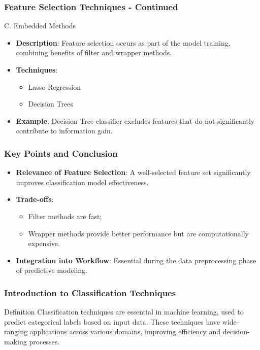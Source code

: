 \documentclass[aspectratio=169]{beamer}
\begin{document}
\begin{frame}[fragile]
    \frametitle{Feature Selection Techniques - Continued}
    \begin{block}{C. Embedded Methods}
        \begin{itemize}
            \item \textbf{Description}: Feature selection occurs as part of the model training, combining benefits of filter and wrapper methods.
            \item \textbf{Techniques}:
                \begin{itemize}
                    \item Lasso Regression
                    \item Decision Trees
                \end{itemize}
            \item \textbf{Example}: Decision Tree classifier excludes features that do not significantly contribute to information gain.
        \end{itemize}
    \end{block}
\end{frame}

\begin{frame}[fragile]
    \frametitle{Key Points and Conclusion}
    \begin{itemize}
        \item \textbf{Relevance of Feature Selection}: A well-selected feature set significantly improves classification model effectiveness.
        \item \textbf{Trade-offs}: 
            \begin{itemize}
                \item Filter methods are fast; 
                \item Wrapper methods provide better performance but are computationally expensive.
            \end{itemize}
        \item \textbf{Integration into Workflow}: Essential during the data preprocessing phase of predictive modeling.
    \end{itemize}
\end{frame}

\begin{frame}
    \frametitle{Introduction to Classification Techniques}
    \begin{block}{Definition}
        Classification techniques are essential in machine learning, used to predict categorical labels based on input data. These techniques have wide-ranging applications across various domains, improving efficiency and decision-making processes.
    \end{block}
\end{frame}
\end{document}
